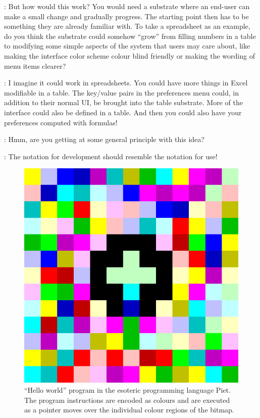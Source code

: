 \documentclass[runningheads]{llncs}
\newcommand{\T}{Tomas}
\newcommand{\J}{Joel}
\newcommand{\says}[2][gg]{\vspace{0.5em}\noindent\hangindent=0.5cm{\textsc{#1}}: #2}
\begin{document}
\says[\T]{But how would this work? You would need a substrate where an end-user can make a small change and gradually progress. The starting point then has to be something they are already familiar with. To take a spreadsheet as an example, do you think the substrate could somehow ``grow'' from filling numbers in a table to modifying some simple aspects of the system that users may care about, like making the interface color scheme colour blind friendly or making the wording of menu items clearer?}

\says[\J]{I imagine it could work in spreadsheets. You could have more things in Excel modifiable in a table. The key/value pairs in the preferences menu could, in addition to their normal UI, be brought into the table substrate. More of the interface could also be defined in a table. And then you could also have your preferences computed with formulas!}

\says[\T]{Hmm, are you getting at some general principle with this idea?}

\says[\J]{The notation for development should resemble the notation for use!}

\begin{figure}[t]
\centering
\begin{minipage}[t]{0.4\textwidth}\vspace{0pt}
  \includegraphics[scale=0.27]{figures/piet.png}
\end{minipage}
\begin{minipage}[t]{0.5\textwidth}\vspace{0pt}
  \caption{``Hello world'' program in the esoteric programming language Piet. The program instructions are encoded as colours and are executed as a pointer moves over the individual colour regions of the bitmap.}
  \label{fig:piet}
\end{minipage}
\end{figure}
\end{document}
